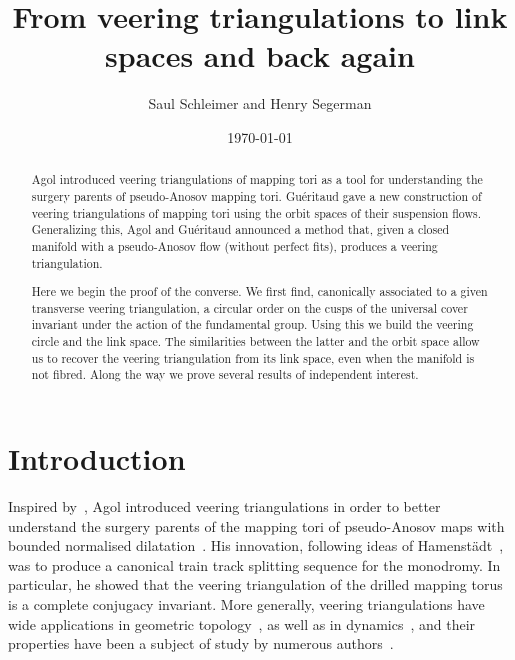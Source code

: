\documentclass[12pt]{amsart}
\title[There and back again]{From veering triangulations to link spaces and back again}
\author{Saul Schleimer and Henry Segerman}
\date{\today}
\begin{document}
\begin{abstract}
Agol introduced veering triangulations of mapping tori as a tool for understanding the surgery parents of pseudo-Anosov mapping tori.  Gu\'eritaud gave a new construction of veering triangulations of mapping tori using the orbit spaces of their suspension flows.  Generalizing this, Agol and Gu\'eritaud announced a method that, given a closed manifold with a pseudo-Anosov flow (without perfect fits), produces a veering triangulation.

Here we begin the proof of the converse.  We first find, canonically associated to a given transverse veering triangulation, a circular order on the cusps of the universal cover invariant under the action of the fundamental group.  Using this we build the veering circle and the link space.  The similarities between the latter and the orbit space allow us to recover the veering triangulation from its link space, even when the manifold is not fibred.  Along the way we prove several results of independent interest. 
\end{abstract}





\maketitle

\section{Introduction}

Inspired by~\cite{FarbLeiningerMargalit11}, Agol introduced veering triangulations in order to better understand the surgery parents of the mapping tori of pseudo-Anosov maps with bounded normalised dilatation~\cite{Agol11}. His innovation, following ideas of Hamenst\"adt~\cite{Hamenstadt09}, was to produce a canonical train track splitting sequence for the monodromy.  In particular, he showed that the veering triangulation of the drilled mapping torus is a complete conjugacy invariant.  More generally, veering triangulations have wide applications in geometric topology~\cite{Bell15, Gueritaud16, MinskyTaylor17, Strenner18, Landry18}, as well as in dynamics~\cite{Frankel18}, and their properties have been a subject of study by numerous authors~\cite{HRST11, FuterGueritaud13, Kozai13, HodgsonIssaSegerman16, Sakata16, Worden18, FuterTaylorWorden18}.
\end{document}
